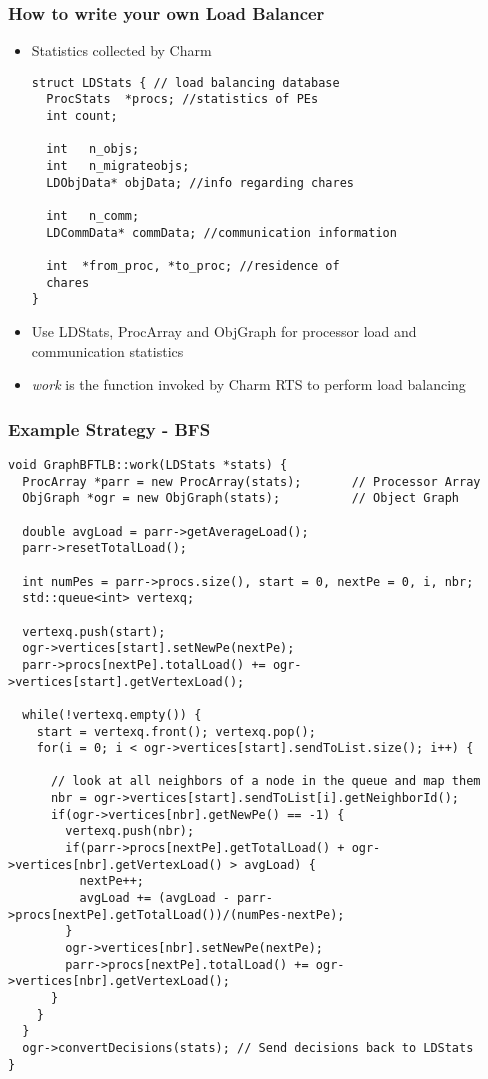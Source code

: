\begin{frame}[fragile]
\frametitle{How to write your own Load Balancer}
\begin{itemize}
\item Statistics collected by Charm
\begin{lstlisting}[basicstyle=\tiny]
struct LDStats { // load balancing database
  ProcStats  *procs; //statistics of PEs
  int count;

  int   n_objs;
  int   n_migrateobjs;
  LDObjData* objData; //info regarding chares

  int   n_comm;
  LDCommData* commData; //communication information

  int  *from_proc, *to_proc; //residence of
  chares
}
\end{lstlisting}
\item Use LDStats, ProcArray and ObjGraph for processor load and communication
statistics
\item \emph{work} is the function invoked by Charm RTS to perform load balancing
\end{itemize}
\end{frame}

\begin{frame}[fragile]
\frametitle{Example Strategy - BFS}
\begin{lstlisting}[basicstyle=\tiny]
void GraphBFTLB::work(LDStats *stats) {
  ProcArray *parr = new ProcArray(stats);       // Processor Array
  ObjGraph *ogr = new ObjGraph(stats);          // Object Graph

  double avgLoad = parr->getAverageLoad();
  parr->resetTotalLoad();

  int numPes = parr->procs.size(), start = 0, nextPe = 0, i, nbr;
  std::queue<int> vertexq;

  vertexq.push(start);
  ogr->vertices[start].setNewPe(nextPe);
  parr->procs[nextPe].totalLoad() += ogr->vertices[start].getVertexLoad();

  while(!vertexq.empty()) {
    start = vertexq.front(); vertexq.pop();
    for(i = 0; i < ogr->vertices[start].sendToList.size(); i++) {

      // look at all neighbors of a node in the queue and map them
      nbr = ogr->vertices[start].sendToList[i].getNeighborId();
      if(ogr->vertices[nbr].getNewPe() == -1) {
        vertexq.push(nbr);
        if(parr->procs[nextPe].getTotalLoad() + ogr->vertices[nbr].getVertexLoad() > avgLoad) { 
          nextPe++;
          avgLoad += (avgLoad - parr->procs[nextPe].getTotalLoad())/(numPes-nextPe);
        }
        ogr->vertices[nbr].setNewPe(nextPe);
        parr->procs[nextPe].totalLoad() += ogr->vertices[nbr].getVertexLoad();
      }
    }
  }   
  ogr->convertDecisions(stats); // Send decisions back to LDStats 
}
\end{lstlisting}
\end{frame}
